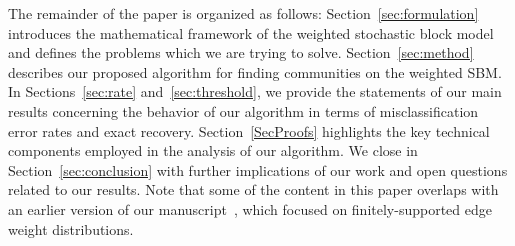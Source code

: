 
The remainder of the paper is organized as follows: Section~\ref{sec:formulation} introduces the mathematical framework of the weighted stochastic block model and defines the problems which we are trying to solve. Section~\ref{sec:method} describes our proposed algorithm for finding communities on the weighted SBM. In Sections~\ref{sec:rate} and~\ref{sec:threshold}, we provide the statements of our main results concerning the behavior of our algorithm in terms of misclassification error rates and exact recovery. Section~\ref{SecProofs} highlights the key technical components employed in the analysis of our algorithm. We close in Section~\ref{sec:conclusion} with further implications of our work and open questions related to our results. Note that some of the content in this paper overlaps with an earlier version of our manuscript~\cite{JogLoh15}, which focused on finitely-supported edge weight distributions.
















